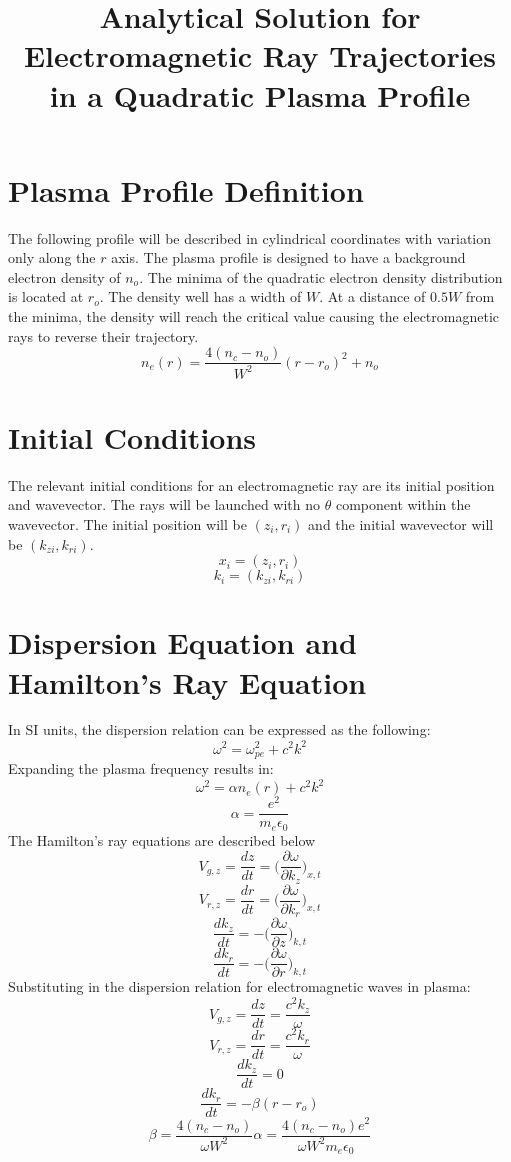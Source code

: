 \documentclass[11pt]{article}
\title{Analytical Solution for Electromagnetic Ray Trajectories in a Quadratic Plasma Profile}
\date{}
\begin{document}
\maketitle

\section*{Plasma Profile Definition}
The following profile will be described in cylindrical coordinates with variation only along the $r$ axis. The plasma profile is designed to have a background electron density of $n_o$. The minima of the quadratic electron density distribution is located at $r_o$. The density well has a width of $W$. At a distance of $0.5W$ from the minima, the density will reach the critical value causing the electromagnetic rays to reverse their trajectory.
$$ n_e(r) = \frac{4(n_c-n_o)}{W^2}(r-r_o)^2 + n_o$$

\section*{Initial Conditions}
The relevant initial conditions for an electromagnetic ray are its initial position and wavevector. The rays will be launched with no $\theta$ component within the wavevector. The initial position will be $(z_i,r_i)$ and the initial wavevector will be $(k_{zi},k_{ri})$. 
$$x_i = (z_i,r_i)$$
$$k_i = (k_{zi},k_{ri})$$

\section*{Dispersion Equation and Hamilton's Ray Equation}
In SI units, the dispersion relation can be expressed as the following:
$$\omega^2 = \omega_{pe}^2 + c^2k^2$$
Expanding the plasma frequency results in:
$$\omega^2 = \alpha n_e(r) + c^2k^2$$
$$\alpha = \frac{e^2}{m_e \epsilon_0}$$
The Hamilton's ray equations are described below
$$V_{g,z} = \frac{dz}{dt} = \bigg(\frac{\partial \omega}{\partial k_z}\bigg)_{x,t}$$
$$V_{r,z} = \frac{dr}{dt} = \bigg(\frac{\partial \omega}{\partial k_r}\bigg)_{x,t}$$
$$\frac{dk_z}{dt} = -\bigg(\frac{\partial \omega}{\partial z}\bigg)_{k,t}$$
$$\frac{dk_r}{dt} = -\bigg(\frac{\partial \omega}{\partial r}\bigg)_{k,t}$$
Substituting in the dispersion relation for electromagnetic waves in plasma:
$$V_{g,z} = \frac{dz}{dt} = \frac{c^2k_z}{\omega}$$
$$V_{r,z} = \frac{dr}{dt} = \frac{c^2k_r}{\omega}$$
$$\frac{dk_z}{dt} = 0$$
$$\frac{dk_r}{dt} = -\beta (r-r_o)$$
$$\beta = \frac{4(n_c-n_o)}{\omega W^2}\alpha = \frac{4(n_c-n_o)e^2}{\omega W^2m_e\epsilon_0}$$
\end{document}
